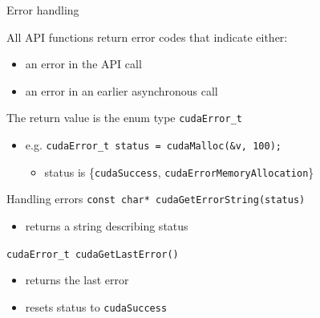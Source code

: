 \documentclass[aspectratio=43]{beamer}
\newcommand{\lst}[1]{\colorbox{white!90!blue}{\lstinline!#1!}}
\begin{document}
\begin{frame}[fragile]{Error handling}

    \begin{info}{}
        All API functions return error codes that indicate either:
        \begin{itemize}
            \item an error in the API call
            \item an error in an earlier asynchronous call
        \end{itemize}
        The return value is the enum type \lst{cudaError_t}
        \begin{itemize}
            \item e.g. \lst{cudaError_t status = cudaMalloc(&v, 100);}
            \begin{itemize}
                \item status is \{\lst{cudaSuccess}, \lst{cudaErrorMemoryAllocation}\}
            \end{itemize}
        \end{itemize}
    \end{info}

    \begin{info}{Handling errors}
        \centering \lst{const char* cudaGetErrorString(status)}
        \begin{itemize}
            \item returns a string describing status
        \end{itemize}
        \centering \lst{cudaError_t cudaGetLastError()}
        \begin{itemize}
            \item returns the last error
            \item resets status to \lst{cudaSuccess}
        \end{itemize}
    \end{info}

\end{frame}
\end{document}
